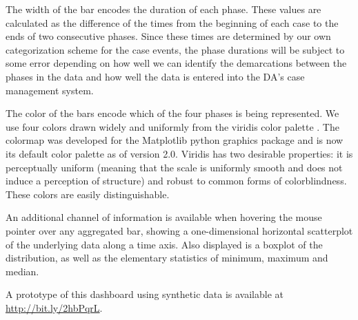 The width of the bar encodes the duration of each phase. These values are calculated as the difference of the times from the beginning of each case to the ends of two consecutive phases. Since these times are determined by our own categorization scheme for the case events, the phase durations will be subject to some error depending on how well we can identify the demarcations between the phases in the data and how well the data is entered into the DA's case management system.

The color of the bars encode which of the four phases is being represented. We use four colors drawn widely and uniformly from the viridis color palette \cite{van_der_walt_matplotlib_2015}. The colormap was developed for the Matplotlib python graphics package and is now its default color palette as of version 2.0. Viridis has two desirable properties: it is perceptually uniform (meaning that the scale is uniformly smooth and does not induce a perception of structure) and robust to common forms of colorblindness. These colors are easily distinguishable.

An additional channel of information is available when hovering the mouse pointer over any aggregated bar, showing a one-dimensional horizontal scatterplot of the underlying data along a time axis. Also displayed is a boxplot of the distribution, as well as the elementary statistics of minimum, maximum and median.

A prototype of this dashboard using synthetic data is available at \href{http://bit.ly/2hbPqrL}{http://bit.ly/2hbPqrL}.